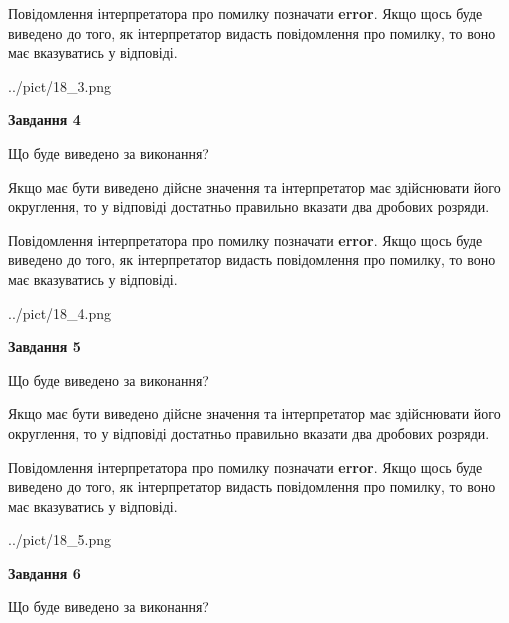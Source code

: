 \documentclass[12pt, ukrainian]{article}
\begin{document}
{\begin {Large}
Повідомлення інтерпретатора про помилку позначати \textbf{error}.
Якщо щось буде виведено до того, як інтерпретатор видасть повідомлення про помилку, 
то воно має вказуватись у відповіді. \par

\begin{center}
	{../pict/18_3.png}
\end{center}
\newpage

{\begin {center}\textbf{Завдання 4}\end {center}}\par
Що буде виведено за виконання? \par

Якщо має бути виведено дійсне значення та інтерпретатор має здійснювати його округлення, 
то у відповіді достатньо правильно вказати два дробових розряди.

Повідомлення інтерпретатора про помилку позначати \textbf{error}.
Якщо щось буде виведено до того, як інтерпретатор видасть повідомлення про помилку, 
то воно має вказуватись у відповіді. \par

\begin{center}
	{../pict/18_4.png}
\end{center}
\newpage

{\begin {center}\textbf{Завдання 5}\end {center}}\par
Що буде виведено за виконання? \par

Якщо має бути виведено дійсне значення та інтерпретатор має здійснювати його округлення, 
то у відповіді достатньо правильно вказати два дробових розряди.

Повідомлення інтерпретатора про помилку позначати \textbf{error}.
Якщо щось буде виведено до того, як інтерпретатор видасть повідомлення про помилку, 
то воно має вказуватись у відповіді. \par

\begin{center}
	{../pict/18_5.png}
\end{center}
\newpage

{\begin {center}\textbf{Завдання 6}\end {center}}\par
Що буде виведено за виконання? \par


\end{Large}}
\end{document}
